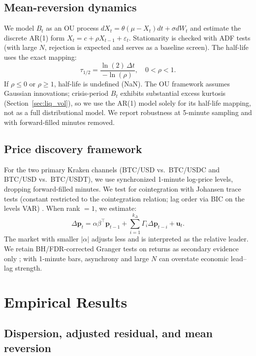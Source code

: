 \documentclass[12pt]{article}
\begin{document}
\subsection{Mean-reversion dynamics}
We model $B_t$ as an OU process $dX_t = \theta(\mu - X_t)dt + \sigma dW_t$ and estimate the discrete AR(1) form $X_t = c + \rho X_{t-1} + \varepsilon_t$. Stationarity is checked with ADF tests (with large $N$, rejection is expected and serves as a baseline screen). The half-life uses the exact mapping:
\begin{equation}
    \tau_{1/2} = \frac{\ln(2)\,\Delta t}{-\ln(\rho)}, \quad 0<\rho<1.
\end{equation}
If $\rho \le 0$ or $\rho \ge 1$, half-life is undefined (NaN). The OU framework assumes Gaussian innovations; crisis-period $B_t$ exhibits substantial excess kurtosis (Section~\ref{sec:liq_vol}), so we use the AR(1) model solely for its half-life mapping, not as a full distributional model. We report robustness at 5-minute sampling and with forward-filled minutes removed.

\subsection{Price discovery framework}
For the two primary Kraken channels (BTC/USD vs.\ BTC/USDC and BTC/USD vs.\ BTC/USDT), we use synchronized 1-minute log-price levels, dropping forward-filled minutes. We test for cointegration with Johansen trace tests (constant restricted to the cointegration relation; lag order via BIC on the levels VAR) \cite{johansen1988,englegranger1987}. When rank $=1$, we estimate:
\begin{equation}
    \Delta \mathbf{p}_t = \alpha \beta^\top \mathbf{p}_{t-1} + \sum_{i=1}^{k_{\Delta}} \Gamma_i \Delta \mathbf{p}_{t-i} + \mathbf{u}_t.
\end{equation}
The market with smaller $|\alpha|$ adjusts less and is interpreted as the relative leader. We retain BH/FDR-corrected Granger tests on returns as secondary evidence only \cite{granger1969}; with 1-minute bars, asynchrony and large $N$ can overstate economic lead--lag strength.

\section{Empirical Results}\label{sec:results}

\subsection{Dispersion, adjusted residual, and mean reversion}
\end{document}
